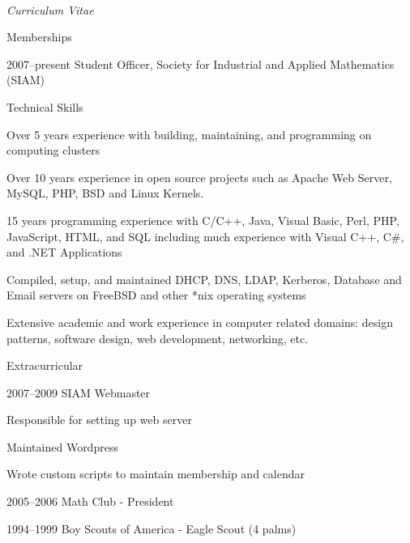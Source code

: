 \documentclass[10pt]{article}
\newenvironment{sublist}{%
	\begin{list}{}{%
		\setlength{\itemsep}{0em}\setlength{\parsep}{0em}%
		\setlength{\topsep}{0em}\setlength{\parskip}{0em}%
	}%
}%
{ \end{list} }
\newenvironment{subbulletlist}{%
	\begin{list}{\labelitemii}{%
		\setlength{\topsep}{\itemsep}\setlength{\parskip}{\parsep}%
	}%
}%
{ \end{list} }
\begin{document}
\begin{cv}{\name\\{\large \itshape Curriculum Vitae}}
\begin{cvlist}{Memberships}
	\item[2007--present] Student Officer, Society for Industrial and Applied Mathematics (SIAM)
\end{cvlist}

\setlength{\oldcvlabelwidth}{\cvlabelwidth}
\setlength{\cvlabelwidth}{1em}
\begin{cvlist}{Technical Skills}
	
		\item Over 5 years experience with building, maintaining, and programming on computing clusters
		\item Over 10 years experience in open source projects such as Apache Web Server, MySQL, PHP, BSD and Linux Kernels.
		\item 15 years programming experience with C/C++, Java, Visual Basic, Perl, PHP, JavaScript,
			HTML, and SQL including much experience with Visual C++, C\#, and .NET Applications
		\item Compiled, setup, and maintained DHCP, DNS, LDAP, Kerberos, Database and Email servers on
			FreeBSD and other *nix operating systems
		\item Extensive academic and work experience in computer related domains: design patterns,
			software design, web development, networking, etc.
\end{cvlist}
\setlength{\cvlabelwidth}{\oldcvlabelwidth}

\begin{cvlist}{Extracurricular}
	\item[2007--2009] SIAM Webmaster
	\begin{subbulletlist}
		\item Responsible for setting up web server
		\item Maintained Wordpress
		\item Wrote custom scripts to maintain membership and calendar
	\end{subbulletlist}
	\item[2005--2006] Math Club - President
	\item[1994--1999] Boy Scouts of America - Eagle Scout (4 palms)
\end{cvlist}


\end{cv}
\end{document}
